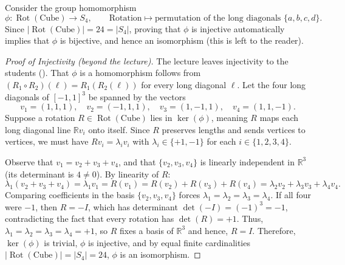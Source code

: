 \begin{content}


Consider the group homomorphism
\[
\phi \colon \operatorname{Rot}(\text{Cube}) \to S_4, \qquad \text{Rotation} \mapsto \text{permutation of the long diagonals } \{a, b, c, d\}.
\]
Since $|\operatorname{Rot}(\text{Cube})| = 24 = |S_4|$, proving that $\phi$ is injective automatically implies that $\phi$ is bijective, and hence an isomorphism (this is left to the reader).

\begin{proof}[Proof of Injectivity (beyond the lecture)]
The lecture leaves injectivity to the students (). That $\phi$ is a homomorphism follows from $(R_1 \circ R_2)(\ell) = R_1(R_2(\ell))$ for every long diagonal $\ell$. Let the four long diagonals of $[-1, 1]^3$ be spanned by the vectors
\[
v_1 = (1, 1, 1), \quad v_2 = (-1, 1, 1), \quad v_3 = (1, -1, 1), \quad v_4 = (1, 1, -1).
\]
Suppose a rotation $R \in \operatorname{Rot}(\text{Cube})$ lies in $\ker(\phi)$, meaning $R$ maps each long diagonal line $\mathbb{R}v_i$ onto itself. Since $R$ preserves lengths and sends vertices to vertices, we must have $R v_i = \lambda_i v_i$ with $\lambda_i \in \{+1, -1\}$ for each $i \in \{1, 2, 3, 4\}$.

Observe that $v_1 = v_2 + v_3 + v_4$, and that $\{v_2, v_3, v_4\}$ is linearly independent in $\mathbb{R}^3$ (its determinant is $4 \neq 0$). By linearity of $R$:
\[
\lambda_1 (v_2 + v_3 + v_4) = \lambda_1 v_1 = R(v_1) = R(v_2) + R(v_3) + R(v_4) = \lambda_2 v_2 + \lambda_3 v_3 + \lambda_4 v_4.
\]
Comparing coefficients in the basis $\{v_2, v_3, v_4\}$ forces $\lambda_1 = \lambda_2 = \lambda_3 = \lambda_4$. If all four were $-1$, then $R = -I$, which has determinant $\det(-I) = (-1)^3 = -1$, contradicting the fact that every rotation has $\det(R) = +1$. Thus, $\lambda_1 = \lambda_2 = \lambda_3 = \lambda_4 = +1$, so $R$ fixes a basis of $\mathbb{R}^3$ and hence, $R = I$. Therefore, $\ker(\phi)$ is trivial, $\phi$ is injective, and by equal finite cardinalities $|\operatorname{Rot}(\text{Cube})| = |S_4| = 24$, $\phi$ is an isomorphism.
\end{proof}
\end{content}

